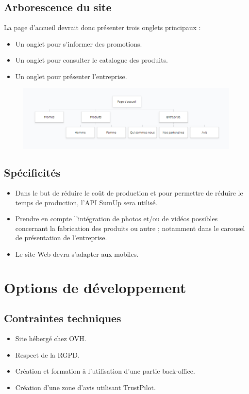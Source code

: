 \documentclass[a4paper, 12pt]{article}
\begin{document}
\subsection{Arborescence du site}
La page d'accueil devrait donc présenter trois onglets principaux :
\begin{itemize}
    \item Un onglet pour s'informer des promotions.
    \item Un onglet pour consulter le catalogue des produits.
    \item Un onglet pour présenter l'entreprise.
\end{itemize}
\begin{figure}[H]
    \centering
    \includegraphics[scale=0.7]{arborescence.png}
\end{figure}
\subsection{Spécificités}
\begin{itemize}
    \item Dans le but de réduire le coût de production et pour permettre de réduire le temps de production, l'API SumUp sera utilisé.
    \item Prendre en compte l'intégration de photos et/ou de vidéos possibles concernant la fabrication des produits ou autre ; notamment dans le carousel de présentation de l'entreprise.
    \item Le site Web devra s'adapter aux mobiles.
\end{itemize}

\section{Options de développement}
\subsection{Contraintes techniques}
\begin{itemize}
    \item Site hébergé chez OVH.
    \item Respect de la RGPD.
    \item Création et formation à l'utilisation d'une partie back-office.
    \item Création d'une zone d'avis utilisant TrustPilot.
\end{itemize}
\end{document}
